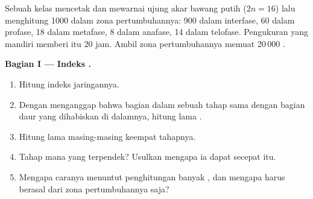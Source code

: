 \begin{problem}
\label{pb:g11:cell-cycle-mitosis:1}
Sebuah kelas mencetak dan mewarnai ujung akar bawang putih ($2n = 16$)
lalu menghitung 1000  dalam zona pertumbuhannya: 900 dalam
interfase, 60 dalam profase, 18 dalam metafase, 8 dalam anafase, 14
dalam telofase. Pengukuran yang mandiri memberi  itu 20 jam.
Ambil zona pertumbuhannya memuat 20\,000 .

\medskip
\noindent\textbf{Bagian I --- Indeks .}
\begin{enumerate}
  \item Hitung indeks  jaringannya.
  \item Dengan menganggap bahwa bagian  dalam sebuah tahap sama
        dengan bagian daur yang dihabiskan di dalamnya, hitung lama
        .
  \item Hitung lama masing-masing keempat tahapnya.
  \item Tahap mana yang terpendek? Usulkan mengapa ia dapat secepat itu.
  \item Mengapa caranya menuntut penghitungan banyak , dan mengapa
         harus berasal dari zona pertumbuhannya saja?
\end{enumerate}


\end{problem}
